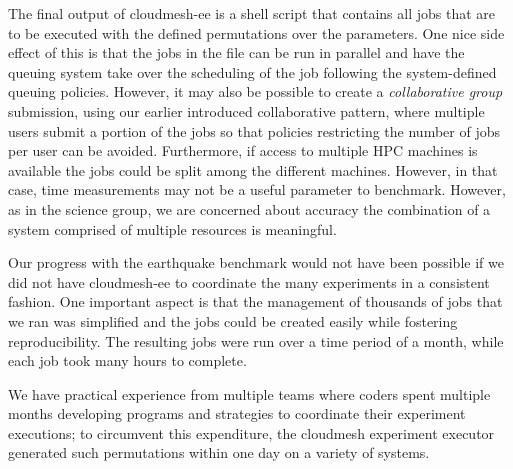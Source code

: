 \documentclass[utf8]{FrontiersinVancouver} %
\begin{document}
The final output of cloudmesh-ee is a shell script that contains all jobs that are to be executed with the defined permutations over the parameters. One nice side effect of this is that the jobs in the file can be run in parallel and have the queuing system take over the scheduling of the job following the system-defined queuing policies. However, it may also be possible to create a {\it collaborative group} submission, using our earlier introduced collaborative pattern, where multiple users submit a portion of the jobs so that policies restricting the number of jobs per user can be avoided. Furthermore, if access to multiple HPC machines is available the jobs could be split among the different machines. However, in that case, time measurements may not be a useful parameter to benchmark. However, as in the science group, we are concerned about accuracy the combination of a system comprised of multiple resources is meaningful.

Our progress with the earthquake benchmark would not have been possible if we did not have cloudmesh-ee to coordinate the many experiments in a consistent fashion. One important aspect is that the management of thousands of jobs that we ran was simplified and the jobs could be created easily while fostering reproducibility. The resulting jobs were run over a time period of a month, while each job took many hours to complete.

We have practical experience from multiple teams where coders spent multiple months developing programs and strategies to coordinate their experiment executions; to circumvent this expenditure, the cloudmesh experiment executor generated such permutations within one day on a variety of systems.
\end{document}
